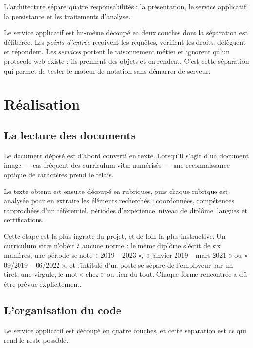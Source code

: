 \documentclass[12pt,a4paper]{report}
\begin{document}
L'architecture sépare quatre responsabilités : la présentation, le service
applicatif, la persistance et les traitements d'analyse.

Le service applicatif est lui-même découpé en deux couches dont la séparation
est délibérée. Les \emph{points d'entrée} reçoivent les requêtes, vérifient les
droits, délèguent et répondent. Les \emph{services} portent le raisonnement
métier et ignorent qu'un protocole web existe : ils prennent des objets et en
rendent. C'est cette séparation qui permet de tester le moteur de notation
sans démarrer de serveur.

\chapter{Réalisation}

\section{La lecture des documents}

Le document déposé est d'abord converti en texte. Lorsqu'il s'agit d'un
document image --- cas fréquent des curriculum vitæ numérisés --- une
reconnaissance optique de caractères prend le relais.

Le texte obtenu est ensuite découpé en rubriques, puis chaque rubrique est
analysée pour en extraire les éléments recherchés : coordonnées, compétences
rapprochées d'un référentiel, périodes d'expérience, niveau de diplôme,
langues et certifications.

Cette étape est la plus ingrate du projet, et de loin la plus instructive. Un
curriculum vitæ n'obéit à aucune norme : le même diplôme s'écrit de six
manières, une période se note « 2019 -- 2023 », « janvier 2019 -- mars 2021 »
ou « 09/2019 -- 06/2022 », et l'intitulé d'un poste se sépare de l'employeur
par un tiret, une virgule, le mot « chez » ou rien du tout. Chaque forme
rencontrée a dû être prévue explicitement.

\section{L'organisation du code}

Le service applicatif est découpé en quatre couches, et cette séparation est
ce qui rend le reste possible.
\end{document}

